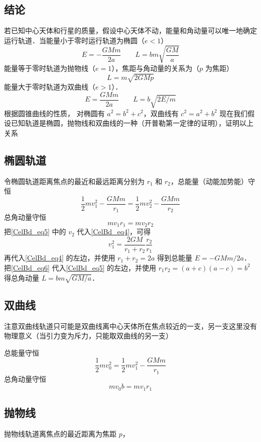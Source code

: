 
\subsection{结论}
若已知中心天体和行星的质量，假设中心天体不动，能量和角动量可以唯一地确定运行轨道．当能量小于零时运行轨道为椭圆（$e<1$）
\begin{equation}
E=-\frac{GMm}{2a} \qquad  L = bm\sqrt {\frac{{GM}}{a}}
\end{equation}
能量等于零时轨道为抛物线（$e=1$），焦距与角动量的关系为（$p$ 为焦距）
\begin{equation}
L = m\sqrt{2GMp}
\end{equation}
能量大于零时轨道为双曲线（$e>1$）．
\begin{equation}
E=\frac{GMm}{2a}  \qquad  L = b\sqrt{2E/m}
\end{equation}
根据圆锥曲线的性质，%
对椭圆有 $a^2=b^2+c^2$，双曲线有 $c^2=a^2+b^2$
现在我们假设已知轨道是椭圆，抛物线和双曲线的一种（开普勒第一定律的证明），证明以上关系

\subsection{椭圆轨道}
令椭圆轨道距离焦点的最近和最远距离分别为 $r_1$ 和 $r_2$，总能量（动能加势能）守恒
\begin{equation}\label{CelBd_eq4}
\frac{1}{2}mv_1^2 - \frac{GMm}{r_1} = \frac{1}{2}mv_2^2 - \frac{GMm}{r_2}
\end{equation}
总角动量守恒
\begin{equation}\label{CelBd_eq5}
mv_1 r_1 = mv_2 r_2
\end{equation}
把\autoref{CelBd_eq5} 中的 $v_2$ 代入\autoref{CelBd_eq4}，可得
\begin{equation}\label{CelBd_eq6}
v_1^2 = \frac{{2GM}}{{{r_1} + {r_2}}}\frac{{{r_2}}}{{{r_1}}}
\end{equation}
再代入\autoref{CelBd_eq4} 的左边，并使用 $r_1+r_2=2a$ %
得到总能量 $E=-{GMm}/{2a}$．把\autoref{CelBd_eq6} 代入\autoref{CelBd_eq5} 的左边，并使用 $r_1 r_2 = (a+c)(a-c) =b^2$ %
得总角动量 $L = bm\sqrt {GM/a}$．

\subsection{双曲线}
注意双曲线轨道只可能是双曲线离中心天体所在焦点较近的一支，另一支这里没有物理意义（当引力变为斥力，只能取双曲线的另一支）

总能量守恒
\begin{equation}
\frac{1}{2}mv_0^2 = \frac{1}{2}mv_1^2 - \frac{GMm}{r_1}
\end{equation}
总角动量守恒
\begin{equation}
mv_0b = mv_1r_1
\end{equation}

\subsection{抛物线}
抛物线轨道离焦点的最近距离为焦距 $p$，

